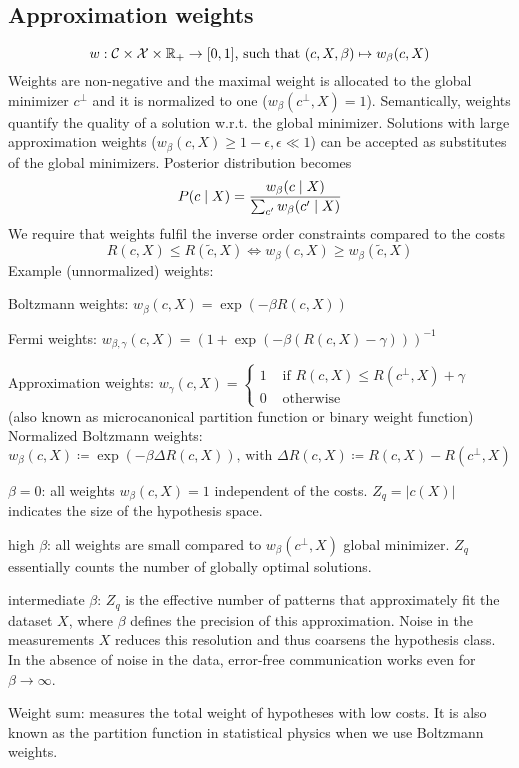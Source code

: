 \documentclass[12pt]{article}
\begin{document}
\subsection{Approximation weights}
\[ w: \mathcal{C}\times\mathcal{X}\times\mathbb{R}_{+} \rightarrow [0,1] \text{, such that } (c,X,\beta) \mapsto w_{\beta}(c,X) \]
Weights are non-negative and the maximal weight is allocated to the global minimizer $c^{\bot}$ and it is normalized to one ($w_{\beta}(c^{\bot},X)=1$). Semantically, weights quantify the quality of a solution w.r.t. the global minimizer. Solutions with large approximation weights ($w_{\beta}(c,X) \geq 1-\epsilon, \epsilon\ll 1$) can be accepted as substitutes of the global minimizers. Posterior distribution becomes
\[ P(c\mid X) = \frac{w_{\beta}(c\mid X)}{\sum_{c'} w_{\beta}(c'\mid X)} \]
We require that weights fulfil the inverse order constraints compared to the costs
\[ R(c,X)\leq R(\tilde{c},X) \iff w_{\beta}(c,X)\geq w_{\beta}(\tilde{c},X) \]
Example (unnormalized) weights:
\ulb
\item Boltzmann weights: $w_{\beta}(c,X) = \exp(-\beta R(c,X))$
\item Fermi weights: $w_{\beta,\gamma}(c,X)  = (1 + \exp(-\beta (R(c,X)-\gamma)))^{-1}$
\item Approximation weights: $w_{\gamma}(c,X) = \begin{cases} 1 & \text{ if } R(c,X)\leq R(c^{\bot},X) + \gamma \\ 0 & \text{ otherwise } \end{cases}$ \\
(also known as microcanonical partition function or binary weight function)
\ule
Normalized Boltzmann weights:
\[ w_{\beta}(c,X) \coloneqq \exp(-\beta \Delta R(c,X)) \text{, with } \Delta R(c,X) \coloneqq R(c,X) - R(c^{\bot}, X) \]
\ulb
\item $\beta=0$: all weights $w_{\beta}(c,X)=1$ independent of the costs. $Z_q = |c(X)|$ indicates the size of the hypothesis space.
\item high $\beta$: all weights are small compared to $w_{\beta}(c^{\bot},X)$  global minimizer. $Z_q$ essentially counts the number of globally optimal solutions.
\item intermediate $\beta$: $Z_q$ is the effective number of patterns that approximately fit the dataset $X$, where $\beta$ defines the precision of this approximation. Noise in the measurements $X$ reduces this resolution and thus coarsens the hypothesis class.
\ule
In the absence of noise in the data, error-free communication works even for $\beta\rightarrow\infty$.
\par Weight sum: measures the total weight of hypotheses with low costs. It is also known as the partition function in statistical physics when we use Boltzmann weights.
\end{document}
